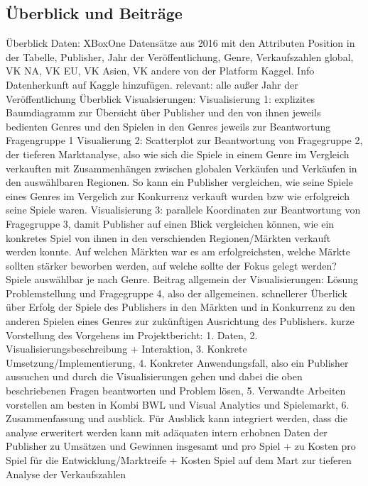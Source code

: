 \documentclass[usegeometry=true]{scrartcl}
\begin{document}
\subsection{Überblick und Beiträge}
Überblick Daten: XBoxOne Datensätze aus 2016 mit den Attributen Position in der Tabelle, Publisher, Jahr der Veröffentlichung, Genre, Verkaufszahlen global, VK NA, VK EU, VK Asien, VK andere von der Platform Kaggel. 
Info Datenherkunft auf Kaggle hinzufügen. relevant: alle außer Jahr der Veröffentlichung
Überblick Visualsierungen:  
Visualisierung 1: explizites Baumdiagramm zur Übersicht über Publisher und den von ihnen jeweils bedienten Genres und den Spielen in den Genres jeweils zur Beantwortung Fragengruppe 1
Visualierung 2: Scatterplot zur Beantwortung von Fragegruppe 2, der tieferen Marktanalyse, also wie sich die Spiele in einem Genre im Vergleich verkauften mit Zusammenhängen zwischen globalen Verkäufen und Verkäufen in den auswählbaren Regionen. So kann ein Publisher vergleichen, wie seine Spiele eines Genres im Vergelich zur Konkurrenz verkauft wurden bzw wie erfolgreich seine Spiele waren.
Visualisierung 3: parallele Koordinaten zur Beantwortung von Fragegruppe 3, damit Publisher auf einen Blick vergleichen können, wie ein konkretes Spiel von ihnen in den verschienden Regionen/Märkten verkauft werden konnte. Auf welchen Märkten war es am erfolgreichsten, welche Märkte sollten stärker beworben werden, auf welche sollte der Fokus gelegt werden? Spiele auswählbar je nach Genre.
Beitrag allgemein der Visualisierungen: Lösung Problemstellung und Fragegruppe 4, also der allgemeinen. schnellerer Überlick über Erfolg der Spiele des Publishers in den Märkten und in Konkurrenz zu den anderen Spielen eines Genres zur zukünftigen Ausrichtung des Publishers.
kurze Vorstellung des Vorgehens im Projektbericht: 1. Daten, 2. Visualisierungsbeschreibung + Interaktion, 3. Konkrete Umsetzung/Implementierung, 4. Konkreter Anwendungsfall, also ein Publisher aussuchen und durch die Visualisierungen gehen und dabei die oben beschriebenen Fragen beantworten und Problem lösen, 5. Verwandte Arbeiten vorstellen am besten in Kombi BWL und Visual Analytics und Spielemarkt, 6. Zusammenfassung und ausblick. Für Ausblick kann integriert werden, dass die analyse erweritert werden kann mit adäquaten intern erhobnen Daten der Publisher zu Umsätzen und Gewinnen insgesamt und pro Spiel + zu Kosten pro Spiel für die Entwicklung/Marktreife + Kosten Spiel auf dem Mart zur tieferen Analyse der Verkaufszahlen


\end{document}
